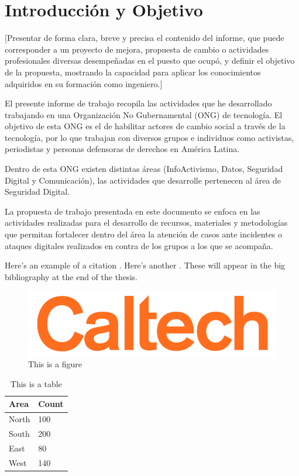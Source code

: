 \documentclass[12pt]{caltech_thesis}
\begin{document}
\chapter{Introducción y Objetivo}

[Presentar de forma clara, breve y precisa el contenido del informe, que puede corresponder a un proyecto de mejora, propuesta de cambio o actividades profesionales diversas desempeñadas en el puesto que ocupó, y definir el objetivo de la propuesta, mostrando la capacidad para aplicar los conocimientos adquiridos en su formación como ingeniero.]

El presente informe de trabajo recopila las actividades que he desarrollado trabajando en una Organización No Gubernamental (ONG)  de tecnología. El objetivo de esta ONG es el de habilitar actores de cambio social a través de la tecnología, por lo que trabajan con diversos grupos e individuos como activistas, periodistas y personas defensoras de derechos en América Latina.

Dentro de esta ONG existen distintas áreas (InfoActivismo, Datos, Seguridad Digital y Comunicación), las actividades que desarrolle pertenecen al área de Seguridad Digital.

La propuesta de trabajo presentada en este documento se enfoca en las actividades realizadas para el desarrollo de recursos, materiales y metodologías que permitan fortalecer dentro del área la atención de casos ante incidentes  o ataques digitales  realizados en contra de los grupos a los que se acompaña.

Here's an example of a citation \citep{GMP81}. Here's another \citep{PP98}. These will appear in the big bibliography at the end of the thesis.


\begin{figure}[hbt!]
    \centering
    \includegraphics[width=.3\textwidth]{img/caltech.png}
    \caption{This is a figure}\label{fig:logo}
\end{figure}

\begin{table}[hbt!]
    \centering
    \begin{tabular}{ll}
        \hline
        Area & Count\\
        \hline
        North & 100\\
        South & 200\\
        East & 80\\
        West & 140\\
        \hline
    \end{tabular}
    \caption{This is a table}\label{tab:sample}
\end{table}
\end{document}
